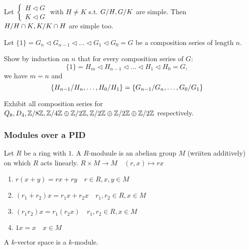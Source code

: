 \begin{exercise}
  Let $\begin{cases}
    H \lhd G \\
    K \lhd G
  \end{cases}$ with $H \ne K$ s.t. ${G}/{H}, {G}/{K}$ are simple.
  Then ${H}/{H\cap K}, {K}/{K \cap H}$ are simple too.
\end{exercise}

\begin{exercise}
  Let $\{1\} = G_n \lhd G_{n-1} \lhd \dots \lhd G_1 \lhd G_0 = G$ be a
  composition series of length $n$.

  Show by induction on $n$ that for every composition series of $G$:
  \[
    \{1\} = H_m \lhd H_{n-1} \lhd \dots \lhd H_1 \lhd H_0 = G,
  \]
  we have $m = n$ and
  \[
    \left\{
      {H_{n-1}}/{H_n}, \dots, {H_0}/{H_1}
    \right\} =
    \left\{
      {G_{n-1}}/{G_n}, \dots, {G_0}/{G_1}
    \right\}
  \]

\end{exercise}

\begin{exercise}
  Exhibit all composition series for
  $Q_8, D_4, {\mathbb{Z}}/{8\mathbb{Z}}, {\mathbb{Z}}/{4\mathbb{Z}} \oplus {\mathbb{Z}}/{2\mathbb{Z}},
  {\mathbb{Z}}/{2\mathbb{Z}} \oplus {\mathbb{Z}}/{2\mathbb{Z}} \oplus {\mathbb{Z}}/{2\mathbb{Z}}$
  respectively.
\end{exercise}

\subsubsection{Modules over a PID}

\begin{definition}
  Let $R$ be a ring with $1$. A $R$-moduule is an abelian group $M$
  (wriiten additively) on which $R$ acts linearly.
  $R \times M \to M \quad (r, x) \mapsto rx$
  \begin{enumerate}
    \item $r(x + y) = rx + ry \quad r \in R, x, y \in M$
    \item $(r_1 + r_2)x = r_1x + r_2x \quad r_1, r_2 \in R, x \in M$
    \item $(r_1r_2)x = r_1(r_2x) \quad r_1, r_2 \in R, x \in M$
    \item $1x = x \quad x \in M$
  \end{enumerate}
\end{definition}

\begin{example}
  A $k$-vector space is a $k$-module.
\end{example}

